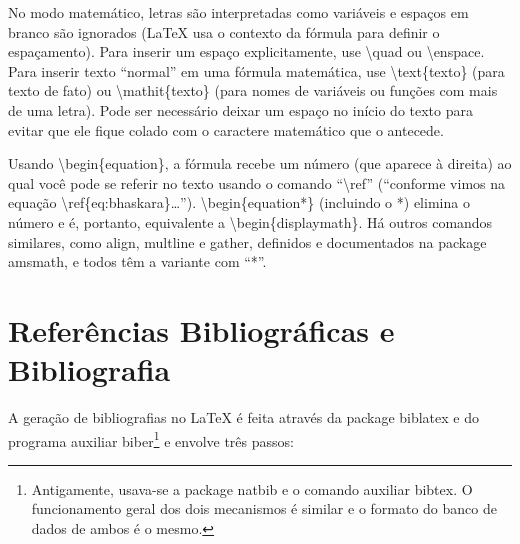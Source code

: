 No modo matemático, letras são interpretadas como variáveis e espaços
em branco são ignorados (\LaTeX{} usa o contexto da fórmula para
definir o espaçamento). Para inserir um espaço explicitamente, use
\textsf{\textbackslash{}quad} ou \textsf{\textbackslash{}enspace}.
Para inserir texto ``normal'' em uma fórmula matemática, use
\textsf{\textbackslash{}text\{texto\}} (para texto de fato) ou
\textsf{\textbackslash{}mathit\{texto\}} (para nomes de variáveis
ou funções com mais de uma letra). Pode ser necessário deixar um
espaço no início do texto para evitar que ele fique colado com o
caractere matemático que o antecede.

Usando \textsf{\textbackslash{}begin\{equation\}}, a fórmula recebe um
número (que aparece à direita) ao qual você pode se referir no texto
usando o comando ``\textsf{\textbackslash{}ref}'' (``\textsf{conforme
vimos na equação \textbackslash{}ref\{eq:bhaskara\}\ldots}'').
\textsf{\textbackslash{}begin\{equation*\}} (incluindo o *) elimina
o número e é, portanto, equivalente a
\textsf{\textbackslash{}begin\{displaymath\}}. Há outros comandos
similares, como \textsf{align}, \textsf{multline} e \textsf{gather},
definidos e documentados na package \textsf{amsmath}, e todos têm
a variante com ``*''.

\section{Referências Bibliográficas e Bibliografia}

A geração de bibliografias no \LaTeX{} é feita através da package
biblatex e do programa auxiliar
biber\footnote{Antigamente, usava-se a package
natbib e o comando auxiliar bibtex. O
funcionamento geral dos dois mecanismos é similar e o formato do banco de
dados de ambos é o mesmo.} e envolve três passos:

